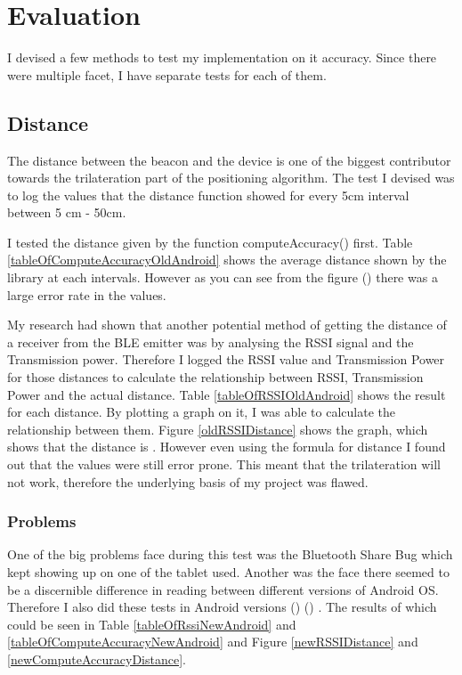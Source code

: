 \section{Evaluation}
I devised a few methods to test my implementation on it accuracy. Since there were multiple facet, I have separate tests for each of them.
\subsection{Distance}
The distance between the beacon and the device is one of the biggest contributor towards the trilateration part of the positioning algorithm. The test I devised was to log the values that the distance function showed for every 5cm interval between 5 cm - 50cm.

I tested the distance given by the function computeAccuracy() first. Table \ref{tableOfComputeAccuracyOldAndroid} shows the average distance shown by the library at each intervals. However as you can see from the figure () there was a large error rate in the values. 

My research had shown that another potential method of getting the distance of a receiver from the BLE emitter was by analysing the RSSI signal and the Transmission power. Therefore I logged the RSSI value and Transmission Power for those distances to calculate the relationship between RSSI, Transmission Power and the actual distance. Table \ref{tableOfRSSIOldAndroid} shows the result for each distance. By plotting a graph on it, I was able to calculate the relationship between them. Figure \ref{oldRSSIDistance} shows the graph, which shows that the distance is .
However even using the formula for distance I found out that the values were still error prone. This meant that the trilateration will not work, therefore the underlying basis of my project was flawed.
\subsubsection{Problems}
One of the big problems face during this test was the Bluetooth Share Bug\cite{bluetooth-share} which kept showing up on one of the tablet used. Another was the face there seemed to be a discernible difference in reading between different versions of Android OS. Therefore I also did these tests in Android versions () () . The results of which could be seen in Table \ref{tableOfRssiNewAndroid} and \ref{tableOfComputeAccuracyNewAndroid} and Figure \ref{newRSSIDistance} and \ref{newComputeAccuracyDistance}.

